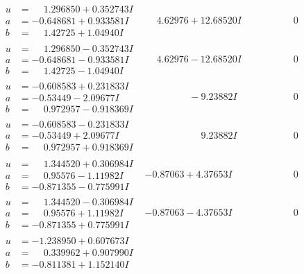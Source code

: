 \documentclass[1p]{elsarticle_modified}
\theoremstyle{definition}
\begin{document}
$$\begin{array}{c|c|c}
\begin{aligned}
u &= \phantom{-}1.296850 + 0.352743 I \\
a &= -0.648681 + 0.933581 I \\
b &= \phantom{-}1.42725 + 1.04940 I\end{aligned}
 & \phantom{-}4.62976 + 12.68520 I & \phantom{-0.000000 } 0 \\ \hline\begin{aligned}
u &= \phantom{-}1.296850 - 0.352743 I \\
a &= -0.648681 - 0.933581 I \\
b &= \phantom{-}1.42725 - 1.04940 I\end{aligned}
 & \phantom{-}4.62976 - 12.68520 I & \phantom{-0.000000 } 0 \\ \hline\begin{aligned}
u &= -0.608583 + 0.231833 I \\
a &= -0.53449 - 2.09677 I \\
b &= \phantom{-}0.972957 - 0.918369 I\end{aligned}
 & \phantom{-0.000000 } -9.23882 I & \phantom{-0.000000 } 0 \\ \hline\begin{aligned}
u &= -0.608583 - 0.231833 I \\
a &= -0.53449 + 2.09677 I \\
b &= \phantom{-}0.972957 + 0.918369 I\end{aligned}
 & \phantom{-0.000000 -}9.23882 I & \phantom{-0.000000 } 0 \\ \hline\begin{aligned}
u &= \phantom{-}1.344520 + 0.306984 I \\
a &= \phantom{-}0.95576 - 1.11982 I \\
b &= -0.871355 - 0.775991 I\end{aligned}
 & -0.87063 + 4.37653 I & \phantom{-0.000000 } 0 \\ \hline\begin{aligned}
u &= \phantom{-}1.344520 - 0.306984 I \\
a &= \phantom{-}0.95576 + 1.11982 I \\
b &= -0.871355 + 0.775991 I\end{aligned}
 & -0.87063 - 4.37653 I & \phantom{-0.000000 } 0 \\ \hline\begin{aligned}
u &= -1.238950 + 0.607673 I \\
a &= \phantom{-}0.339962 + 0.907990 I \\
b &= -0.811381 + 1.152140 I\end{aligned}

\end{array}$$
\end{document}

